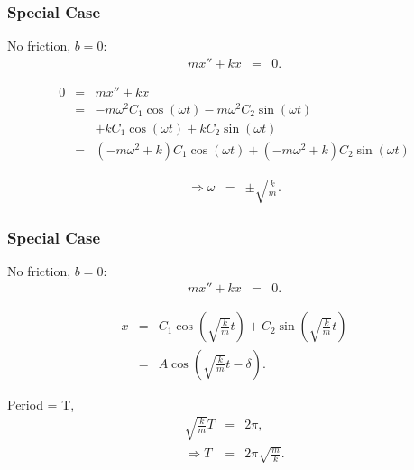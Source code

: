 \documentclass{beamer}
\newcommand{\lp}{\left(}
\newcommand{\rp}{\right)}
\begin{document}
\begin{frame}
  \frametitle{Special Case}

  No friction, $b=0$:
  \begin{eqnarray*}
    m x'' + kx & = & 0.
  \end{eqnarray*}

  {
    \begin{eqnarray*}
      0 & = & mx''+kx \\
        & = & - m\omega^2 C_1 \cos(\omega t) - m\omega^2 C_2 \sin(\omega t) \\
        &   & + k C_1 \cos(\omega t) + k C_2 \sin(\omega t)\\
        & = & \lp -m \omega^2 + k \rp C_1 \cos(\omega t) +
              \lp -m \omega^2 + k \rp C_2 \sin(\omega t)
    \end{eqnarray*}
  }

  {
    \begin{eqnarray*}
      \Rightarrow \omega & = & \pm \sqrt{\frac{k}{m}}.
    \end{eqnarray*}
  }

  \vfill

\end{frame}


\begin{frame}
  \frametitle{Special Case}

  No friction, $b=0$:
  \begin{eqnarray*}
    m x'' + kx & = & 0.
  \end{eqnarray*}

  \begin{eqnarray*}
    x & = & C_1 \cos\lp\sqrt{\frac{k}{m}} t\rp +
    C_2 \sin\lp\sqrt{\frac{k}{m}} t\rp \\
    & = & A \cos\lp \sqrt{\frac{k}{m}} t - \delta \rp.
  \end{eqnarray*}

  Period = T,
  \begin{eqnarray*}
    \sqrt{\frac{k}{m}} T & = & 2\pi, \\
    \Rightarrow T & = & 2 \pi \sqrt{\frac{m}{k}}.
  \end{eqnarray*}

\end{frame}
\end{document}
